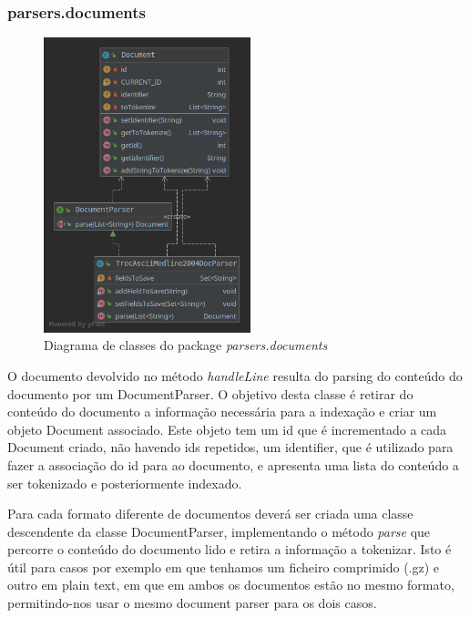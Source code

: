 \documentclass[12pt]{article}
\begin{document}
\subsubsection{parsers.documents}
\begin{figure}[h]
  \center
  \includegraphics[width=6cm]{packages_parsers_documents.png}
  \caption{Diagrama de classes do package \it parsers.documents}
\end{figure}

O documento devolvido no método {\it handleLine} resulta do parsing do conteúdo do
documento por um DocumentParser. O objetivo desta classe é retirar do conteúdo do documento
a informação necessária para a indexação e criar um objeto Document associado. Este objeto
tem um id que é incrementado a cada Document criado, não havendo ids repetidos, um identifier,
que é utilizado para fazer a associação do id para ao documento, e apresenta uma lista do
conteúdo a ser tokenizado e posteriormente indexado.

Para cada formato diferente de documentos deverá ser criada uma classe descendente da classe
DocumentParser, implementando o método {\it parse} que percorre o conteúdo do documento
lido e retira a informação a tokenizar. Isto é útil para casos por exemplo em que tenhamos um
ficheiro comprimido (.gz) e outro em plain text, em que em ambos os documentos estão no
mesmo formato, permitindo-nos usar o mesmo document parser para os dois casos.
\end{document}
